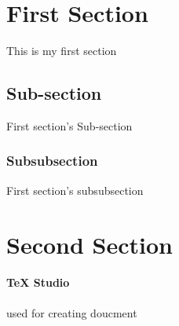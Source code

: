 \documentclass{article}
\begin{document}
	\section{First Section}
	This is my first section
	\subsection{Sub-section}
	First section's Sub-section
	\subsubsection{Subsubsection}
	First section's subsubsection
	\section{Second Section}
	\paragraph{TeX Studio}
	used for creating doucment
\end{document}
